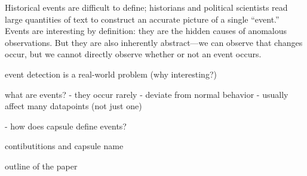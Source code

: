 
Historical events are difficult to define; historians and political scientists read large quantities of text to construct an accurate picture of a single ``event.''  Events are interesting by definition: they are the hidden causes of anomalous observations.  But they are also inherently abstract---we can observe that changes occur, but we cannot directly observe whether or not an event occurs.

\PP event detection is a real-world problem (why interesting?)

\PP what are events?
- they occur rarely
- deviate from normal behavior
- usually affect many datapoints (not just one)




- how does capsule define events?

\PP contibutitions and capsule name

\PP outline of the paper











